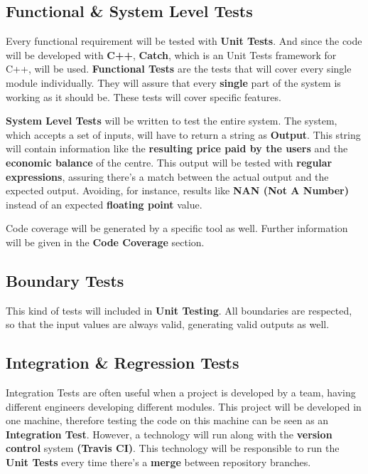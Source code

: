 \documentclass[12pt]{article}
\begin{document}
\subsection*{Functional \& System Level Tests}

Every functional requirement will be tested with \textbf{Unit Tests}. And since the code will be developed with \textbf{C++}, \textbf{Catch}, which is an Unit Tests framework for C++, will be used. 
\textbf{Functional Tests} are the tests that will cover every single module individually. They will assure that every \textbf{single} part of the system is working as it should be. These tests will cover specific features.

\textbf{System Level Tests} will be written to test the entire system. The system, which accepts a set of inputs, will have to return a string as \textbf{Output}. This string will contain information like the \textbf{resulting price paid by the users} and the \textbf{economic balance} of the centre. This output will be tested with \textbf{regular expressions}, assuring there's a match between the actual output and the expected output. Avoiding, for instance, results like \textbf{NAN (Not A Number)} instead of an expected \textbf{floating point} value.

Code coverage will be generated by a specific tool as well. Further information will be given in the \textbf{Code Coverage} section.

\subsection*{Boundary Tests}

This kind of tests will included in \textbf{Unit Testing}. All boundaries are respected, so that the input values are always valid, generating valid outputs as well. 

\subsection*{Integration \& Regression Tests}

Integration Tests are often useful when a project is developed by a team, having different engineers developing different modules. This project will be developed in one machine, therefore testing the code on this machine can be seen as an \textbf{Integration Test}. However, a technology will run along with the \textbf{version control} system \textbf{(Travis CI)}. This technology will be responsible to run the \textbf{Unit Tests} every time there's a \textbf{merge} between repository branches. 
\end{document}
